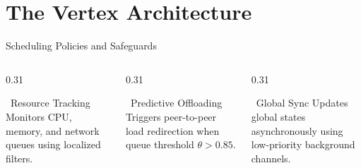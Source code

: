 \section{The Vertex Architecture}

\begin{frame}{Scheduling Policies and Safeguards}
  \begin{columns}[T]
    \begin{column}{0.31\textwidth}
      \begin{block}{\faChartLine\ Resource Tracking}
        Monitors CPU, memory, and network queues using localized filters.
      \end{block}
    \end{column}
    \begin{column}{0.31\textwidth}
      \begin{alertblock}{\faExclamationTriangle\ Predictive Offloading}
        Triggers peer-to-peer load redirection when queue threshold $\theta > 0.85$.
      \end{alertblock}
    \end{column}
    \begin{column}{0.31\textwidth}
      \begin{exampleblock}{\faSync\ Global Sync}
        Updates global states asynchronously using low-priority background channels.
      \end{exampleblock}
    \end{column}
  \end{columns}
\end{frame}

